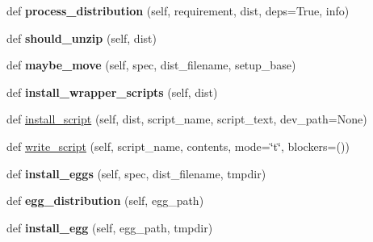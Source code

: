\begin{DoxyCompactItemize}
def {\bfseries process\+\_\+distribution} (self, requirement, dist, deps=True, info)
\item 
\mbox{\label{classsetuptools_1_1command_1_1easy__install_1_1easy__install_a596c58dba7a122d23ddc5dd0d35e9809}} 
def {\bfseries should\+\_\+unzip} (self, dist)
\item 
\mbox{\label{classsetuptools_1_1command_1_1easy__install_1_1easy__install_a083c308310d7d4def543311f6d1b1c8c}} 
def {\bfseries maybe\+\_\+move} (self, spec, dist\+\_\+filename, setup\+\_\+base)
\item 
\mbox{\label{classsetuptools_1_1command_1_1easy__install_1_1easy__install_a35dd854e1ef13388ddc20486d5f7e96d}} 
def {\bfseries install\+\_\+wrapper\+\_\+scripts} (self, dist)
\item 
def \hyperlink{classsetuptools_1_1command_1_1easy__install_1_1easy__install_af6e499b6e280b6f2a69e8a3d4d82e7a5}{install\+\_\+script} (self, dist, script\+\_\+name, script\+\_\+text, dev\+\_\+path=None)
\item 
def \hyperlink{classsetuptools_1_1command_1_1easy__install_1_1easy__install_ac39a37c389cdaef20825f497e941c018}{write\+\_\+script} (self, script\+\_\+name, contents, mode=\char`\"{}t\char`\"{}, blockers=())
\item 
\mbox{\label{classsetuptools_1_1command_1_1easy__install_1_1easy__install_afb2b25bc2760450a095011037b5bc5f5}} 
def {\bfseries install\+\_\+eggs} (self, spec, dist\+\_\+filename, tmpdir)
\item 
\mbox{\label{classsetuptools_1_1command_1_1easy__install_1_1easy__install_a5fa017fde5091939435dde025aa7cc74}} 
def {\bfseries egg\+\_\+distribution} (self, egg\+\_\+path)
\item 
\mbox{\label{classsetuptools_1_1command_1_1easy__install_1_1easy__install_a04769d37e9ac958b38314bf794fed23d}} 
def {\bfseries install\+\_\+egg} (self, egg\+\_\+path, tmpdir)
\item 

\end{DoxyCompactItemize}
